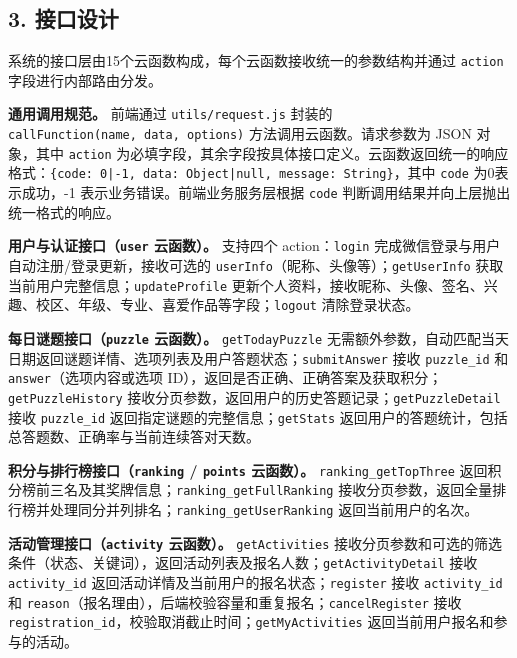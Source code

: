 \documentclass[a4paper,12pt]{article}
\begin{document}
\subsection{3. 接口设计}

系统的接口层由15个云函数构成，每个云函数接收统一的参数结构并通过 \texttt{action} 字段进行内部路由分发。

\textbf{通用调用规范。} 前端通过 \texttt{utils/request.js} 封装的 \texttt{callFunction(\allowbreak name,\allowbreak\ data,\allowbreak\ options)} 方法调用云函数。请求参数为 JSON 对象，其中 \texttt{action} 为必填字段，其余字段按具体接口定义。云函数返回统一的响应格式：\texttt{\{code:\allowbreak\ 0|‐1,\allowbreak\ data:\allowbreak\ Object|null,\allowbreak\ message:\allowbreak\ String\}}，其中 \texttt{code} 为0表示成功，-1 表示业务错误。前端业务服务层根据 \texttt{code} 判断调用结果并向上层抛出统一格式的响应。

\textbf{用户与认证接口（\texttt{user} 云函数）。} 支持四个 action：\texttt{login} 完成微信登录与用户自动注册/登录更新，接收可选的 \texttt{userInfo}（昵称、头像等）；\texttt{getUserInfo} 获取当前用户完整信息；\texttt{updateProfile} 更新个人资料，接收昵称、头像、签名、兴趣、校区、年级、专业、喜爱作品等字段；\texttt{logout} 清除登录状态。

\textbf{每日谜题接口（\texttt{puzzle} 云函数）。} \texttt{getTodayPuzzle} 无需额外参数，自动匹配当天日期返回谜题详情、选项列表及用户答题状态；\texttt{submitAnswer} 接收 \texttt{puzzle\_id} 和 \texttt{answer}（选项内容或选项 ID），返回是否正确、正确答案及获取积分；\texttt{getPuzzleHistory} 接收分页参数，返回用户的历史答题记录；\texttt{getPuzzleDetail} 接收 \texttt{puzzle\_id} 返回指定谜题的完整信息；\texttt{getStats} 返回用户的答题统计，包括总答题数、正确率与当前连续答对天数。

\textbf{积分与排行榜接口（\texttt{ranking} / \texttt{points} 云函数）。} \texttt{ranking\_getTopThree} 返回积分榜前三名及其奖牌信息；\texttt{ranking\_getFullRanking} 接收分页参数，返回全量排行榜并处理同分并列排名；\texttt{ranking\_getUserRanking} 返回当前用户的名次。

\textbf{活动管理接口（\texttt{activity} 云函数）。} \texttt{getActivities} 接收分页参数和可选的筛选条件（状态、关键词），返回活动列表及报名人数；\texttt{getActivityDetail} 接收 \texttt{activity\_id} 返回活动详情及当前用户的报名状态；\texttt{register} 接收 \texttt{activity\_id} 和 \texttt{reason}（报名理由），后端校验容量和重复报名；\texttt{cancelRegister} 接收 \texttt{registration\_id}，校验取消截止时间；\texttt{getMyActivities} 返回当前用户报名和参与的活动。
\end{document}
